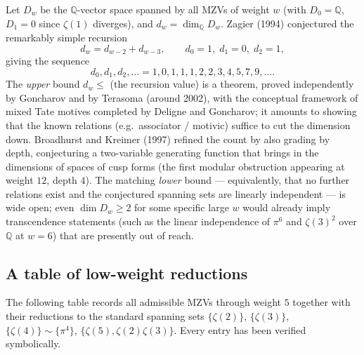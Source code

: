 Let $D_w$ be the $\mathbb{Q}$-vector space spanned by all MZVs of weight $w$ (with $D_0=\mathbb{Q}$, $D_1=0$ since $\zeta(1)$ diverges), and $d_w=\dim_\mathbb{Q}D_w$. Zagier (1994) conjectured the remarkably simple recursion
\begin{equation}
  d_w=d_{w-2}+d_{w-3},\qquad d_0=1,\;d_1=0,\;d_2=1,
  \label{found:eq:zagier-dim}
\end{equation}
giving the sequence
\[
  d_0,d_1,d_2,\dots=1,0,1,1,1,2,2,3,4,5,7,9,\dots .
\]
The \emph{upper} bound $d_w\le$ (the recursion value) is a theorem, proved independently by Goncharov and by Terasoma (around 2002), with the conceptual framework of mixed Tate motives completed by Deligne and Goncharov; it amounts to showing that the known relations (e.g.\ associator / motivic) suffice to cut the dimension down. Broadhurst and Kreimer (1997) refined the count by also grading by depth, conjecturing a two-variable generating function that brings in the dimensions of spaces of cusp forms (the first modular obstruction appearing at weight $12$, depth $4$). The matching \emph{lower} bound --- equivalently, that no further relations exist and the conjectured spanning sets are linearly independent --- is wide open; even $\dim D_w\ge2$ for some specific large $w$ would already imply transcendence statements (such as the linear independence of $\pi^6$ and $\zeta(3)^2$ over $\mathbb{Q}$ at $w=6$) that are presently out of reach.

\subsection*{A table of low-weight reductions}

The following table records all admissible MZVs through weight $5$ together with their reductions to the standard spanning sets $\{\zeta(2)\}$, $\{\zeta(3)\}$, $\{\zeta(4)\}\sim\{\pi^4\}$, $\{\zeta(5),\zeta(2)\zeta(3)\}$. Every entry has been verified symbolically.

